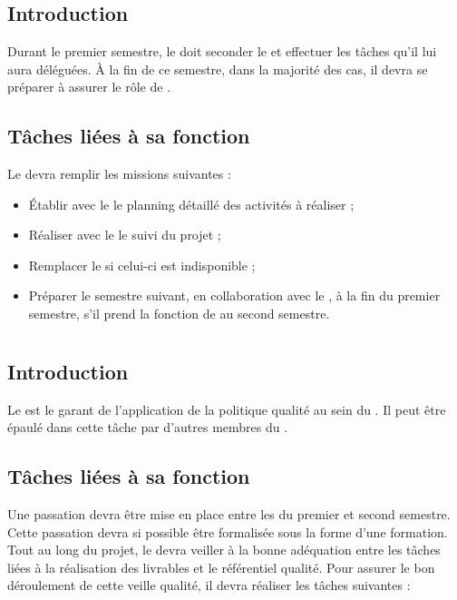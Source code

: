 \section{\CPA}
\subsection*{Introduction}

Durant le premier semestre, le \CPA doit seconder le \CP et effectuer les tâches qu’il lui aura déléguées. À la fin de ce semestre, dans la majorité des cas, il devra se préparer à assurer le rôle de \CP.

\subsection*{Tâches liées à sa fonction}

Le \CPA devra remplir les missions suivantes :
\begin{itemize}
	\item Établir avec le \CP le planning détaillé des activités à réaliser ;
	\item Réaliser avec le \CP le suivi du projet ;
	\item Remplacer le \CP si celui-ci est indisponible ;
	\item Préparer le semestre suivant, en collaboration avec le \CP, à la fin du premier semestre, s’il prend la fonction de \CP au second semestre.
\end{itemize}

\newpage
\section{\RQ}
\subsection*{Introduction}

Le \RQ est le garant de l’application de la politique qualité au sein du \PICCourt. Il peut être épaulé dans cette tâche par d’autres membres du \PICCourt.

\subsection*{Tâches liées à sa fonction}

Une passation devra être mise en place entre les \RQs du premier et second semestre. Cette passation devra si possible être formalisée sous la forme d’une formation.\\
Tout au long du projet, le \RQ devra veiller à la bonne adéquation entre les tâches liées à la réalisation des livrables et le référentiel qualité. Pour assurer le bon déroulement de cette veille qualité, il devra réaliser les tâches suivantes :

